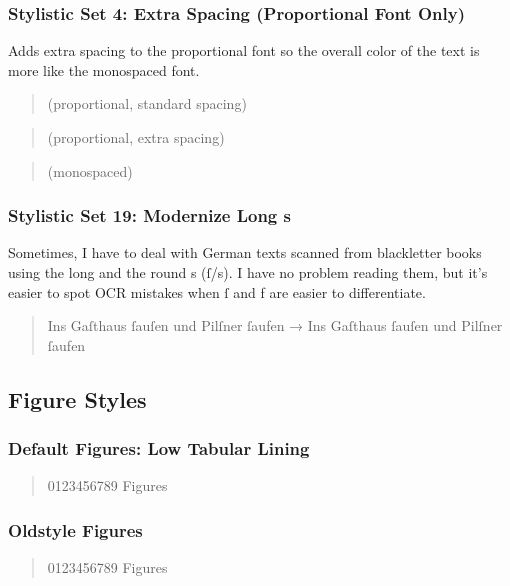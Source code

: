 \subsubsection{Stylistic Set 4: Extra Spacing (Proportional Font Only)}

Adds extra spacing to the proportional font so the overall color of the text is more like the monospaced font.

\begin{quote}
{\setmainfont{SudoUIVariable.ttf} \raggedright\sample (proportional, standard spacing)}
\end{quote}
\begin{quote}
{\setmainfont{SudoUIVariable.ttf}  \raggedright\sample (proportional, extra spacing)}
\end{quote}
\begin{quote}
{ \sample (monospaced)}
\end{quote}

\subsubsection{Stylistic Set 19: Modernize Long s}

Sometimes, I have to deal with German texts scanned from blackletter books using the long and the round s (ſ/s). I have no problem reading them, but it’s easier to spot OCR mistakes when ſ and f are easier to differentiate.

\begin{quote}
Ins Gaſthaus ſauſen und Pilſner ſaufen → { Ins Gaſthaus ſauſen und Pilſner ſaufen}
\end{quote}

\subsection{Figure Styles}

\subsubsection{Default Figures: Low Tabular Lining}

\begin{quote}
0123456789 Figures
\end{quote}

\subsubsection{Oldstyle Figures}
\begin{quote}
{ 0123456789 Figures}
\end{quote}

